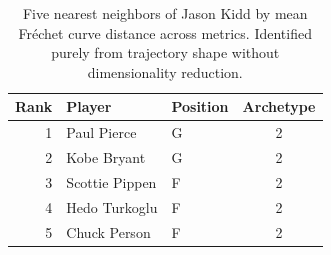 \begin{table}[htbp]
  \centering\small
  \begin{tabular}{rllc}
    \toprule
    Rank & Player & Position & Archetype \\
    \midrule
    1 & Paul Pierce & G & 2 \\
    2 & Kobe Bryant & G & 2 \\
    3 & Scottie Pippen & F & 2 \\
    4 & Hedo Turkoglu & F & 2 \\
    5 & Chuck Person & F & 2 \\
    \bottomrule
  \end{tabular}
  \caption{Five nearest neighbors of Jason Kidd by mean Fr\'{e}chet curve distance across metrics. Identified purely from trajectory shape without dimensionality reduction.}
  \label{tab:Jason_Kidd_frechet_curve_neighbors}
\end{table}

